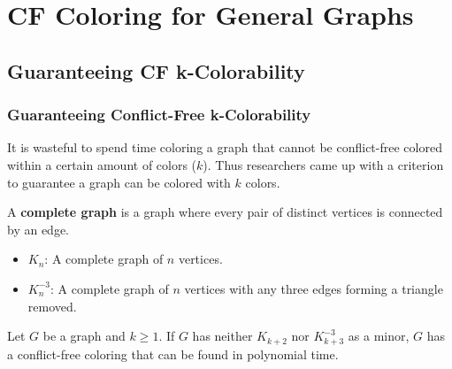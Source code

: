 \documentclass[xcolor=dvipsnames,aspectratio=1610]{beamer}
\begin{document}

  \section{CF Coloring for General Graphs}
  \subsection{Guaranteeing CF k-Colorability}
  \begin{frame}
    \frametitle{Guaranteeing Conflict-Free k-Colorability}

    It is wasteful to spend time coloring a graph that cannot be conflict-free colored within a certain amount of colors ($k$). Thus researchers came up with a criterion to guarantee a graph can be colored with $k$ colors.

    \pause
    \vfill

    A \textbf{complete graph} is a graph where every pair of distinct vertices is connected by an edge.

    \pause

    \begin{itemize}
      \item $K_n$: A complete graph of $n$ vertices.
      \pause
      \item $K_n^{-3}$: A complete graph of $n$ vertices with any three edges forming a triangle removed.
    \end{itemize}

    \pause
    \vfill

    \begin{theorem}
    Let $G$ be a graph and $k \geq 1$. If $G$ has neither $K_{k+2}$ nor $K_{k+3}^{-3}$ as a minor, $G$ has a conflict-free coloring that can be found in polynomial time.
    \end{theorem}

  \end{frame}
\end{document}

